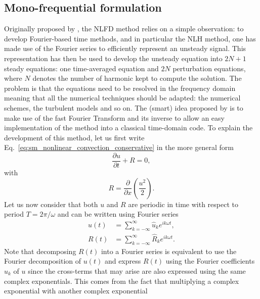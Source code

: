 
\subsection{Mono-frequential formulation}

Originally proposed by \citet{McMullen2001}, the NLFD
method relies on a simple observation: 
to develop Fourier-based time methods, and in
particular the NLH method, one has made use of the Fourier
series to efficiently represent an unsteady signal.
This representation has then be used to develop the unsteady
equation into $2N+1$ steady equations: one time-averaged equation
and $2N$ perturbation equations, 
where $N$ denotes the number
of harmonic kept to compute the solution.
The problem is that the equations need to be 
resolved in the frequency domain meaning
that all the numerical techniques should be adapted: the numerical schemes,
the turbulent models and so on. The (smart) idea 
proposed by \citet{McMullen2001} is to
make use of the fast Fourier Transform and its inverse to
allow an easy implementation of the method into a classical time-domain code.
To explain the development of this method, let us first 
write Eq.~\eqref{eq:sm_nonlinear_convection_conservative} 
in the more general form
\begin{equation}
	\frac{\partial u}{\partial t} + R = 0,
	\label{eq:sm_nonlinear_convection_residual}
\end{equation}
with
\begin{equation}
	R = \frac{\partial}{\partial x} \left( 
	\frac{u^2}{2} \right).
\end{equation}
Let us now consider that both $u$ and $R$ are periodic
in time with respect to period $T = 2 \pi / \omega$
and can be written using Fourier series
\begin{equation}
	\begin{split}
		u(t) &= \sum_{k=-\infty}^{\infty} \widehat{u}_k e^{i k \omega t}, \\
		R(t) &= \sum_{k=-\infty}^{\infty} \widehat{R}_k e^{i k \omega t}.
	\end{split}
\end{equation}
Note that decomposing $R(t)$ into a Fourier series is equivalent
to use the Fourier decomposition of $u(t)$ and express
$R(t)$ using the Fourier coefficients $\widehat{u}_k$ of $u$
since the cross-terms that may arise are also expressed 
using the same complex exponentials. This comes from the fact
that multiplying a complex exponential with another complex exponential
